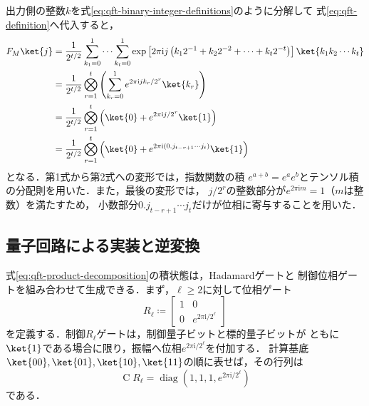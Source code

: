 出力側の整数$k$を式\eqref{eq:qft-binary-integer-definitions}のように分解して
式\eqref{eq:qft-definition}へ代入すると，
\begin{align}
  F_M\ket{j}
  &=
  \frac{1}{2^{t/2}}
  \sum_{k_1=0}^{1}\cdots\sum_{k_t=0}^{1}
  \exp\left[
    2\pi\mathrm{i}j
    \left(
      k_1 2^{-1}+k_2 2^{-2}+\cdots+k_t 2^{-t}
    \right)
  \right]
  \ket{k_1k_2\cdots k_t}
  \notag\\
  &=
  \frac{1}{2^{t/2}}
  \bigotimes_{r=1}^{t}
  \left(
    \sum_{k_r=0}^{1}
    e^{2\pi\mathrm{i}jk_r/2^r}\ket{k_r}
  \right)
  \notag\\
  &=
  \frac{1}{2^{t/2}}
  \bigotimes_{r=1}^{t}
  \left(
    \ket{0}
    +e^{2\pi\mathrm{i}j/2^r}\ket{1}
  \right)
  \notag\\
  &=
  \frac{1}{2^{t/2}}
  \bigotimes_{r=1}^{t}
  \left(
    \ket{0}
    +e^{2\pi\mathrm{i}(0.j_{t-r+1}\cdots j_t)}\ket{1}
  \right)
  \label{eq:qft-product-decomposition}
\end{align}
となる．第1式から第2式への変形では，指数関数の積
$e^{a+b}=e^a e^b$とテンソル積の分配則を用いた．また，最後の変形では，
$j/2^r$の整数部分が$e^{2\pi\mathrm{i}m}=1$（$m$は整数）を満たすため，
小数部分$0.j_{t-r+1}\cdots j_t$だけが位相に寄与することを用いた．

\subsection{量子回路による実装と逆変換}
\label{subsec:qft-circuit-construction}

式\eqref{eq:qft-product-decomposition}の積状態は，Hadamardゲートと
制御位相ゲートを組み合わせて生成できる．まず，$\ell\geq2$に対して位相ゲート
\begin{equation}
  R_\ell
  \coloneq
  \begin{bmatrix}
    1 & 0\\
    0 & e^{2\pi\mathrm{i}/2^\ell}
  \end{bmatrix}
  \label{eq:qft-phase-gate}
\end{equation}
を定義する．制御$R_\ell$ゲートは，制御量子ビットと標的量子ビットが
ともに$\ket{1}$である場合に限り，振幅へ位相$e^{2\pi\mathrm{i}/2^\ell}$を付加する．
計算基底$\ket{00},\ket{01},\ket{10},\ket{11}$の順に表せば，その行列は
\begin{equation}
  \operatorname{C}R_\ell
  =
  \operatorname{diag}
  \left(
    1,1,1,e^{2\pi\mathrm{i}/2^\ell}
  \right)
  \label{eq:qft-controlled-phase-gate}
\end{equation}
である．

